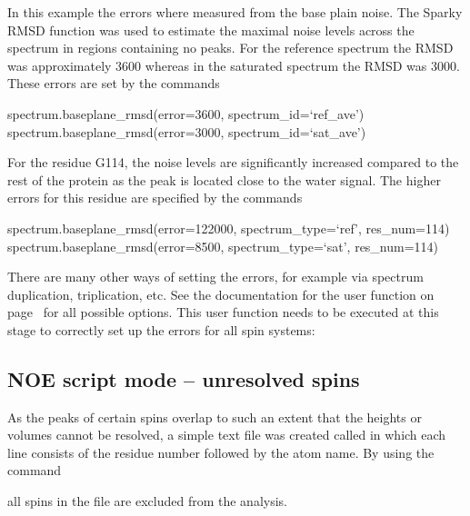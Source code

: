 In this example the errors where measured from the base plain noise.  The Sparky RMSD function was used to estimate the maximal noise levels across the spectrum in regions containing no peaks.  For the reference spectrum the RMSD was approximately 3600 whereas in the saturated spectrum the RMSD was 3000.  These errors are set by the commands

\begin{exampleenv}
spectrum.baseplane\_rmsd(error=3600, spectrum\_id=`ref\_ave') \\
spectrum.baseplane\_rmsd(error=3000, spectrum\_id=`sat\_ave')
\end{exampleenv}

For the residue G114, the noise levels are significantly increased compared to the rest of the protein as the peak is located close to the water signal.  The higher errors for this residue are specified by the commands

\begin{exampleenv}
spectrum.baseplane\_rmsd(error=122000, spectrum\_type=`ref', res\_num=114) \\
spectrum.baseplane\_rmsd(error=8500, spectrum\_type=`sat', res\_num=114)
\end{exampleenv}

There are many other ways of setting the errors, for example via spectrum duplication, triplication, etc.  See the documentation for the  user function on page~\pageref{uf: spectrum.error_analysis} for all possible options.  This user function needs to be executed at this stage to correctly set up the errors for all spin systems:




\subsection{NOE script mode -- unresolved spins}

As the peaks of certain spins overlap to such an extent that the heights or volumes cannot be resolved, a simple text file was created called  in which each line consists of the residue number followed by the atom name.  By using the command


all spins in the file  are excluded from the analysis.



